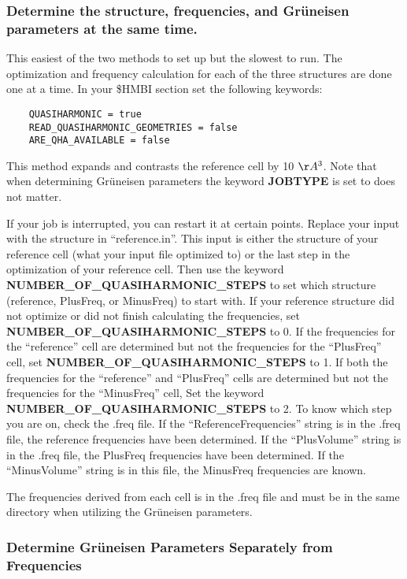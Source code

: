 \documentclass[11pt,letterpaper]{article}
\begin{document}
\begin{spacing}{1.0}
\subsubsection{ Determine the structure, frequencies, and Gr\"{u}neisen  parameters at the same time.}
\label{Sec-Grun-same-time}

This easiest of the two methods to set up but the slowest to run. The optimization and frequency calculation for each
of the three structures are done one at a time.
In your \$HMBI section set the following keywords:

\begin{verbatim}
    QUASIHARMONIC = true
    READ_QUASIHARMONIC_GEOMETRIES = false
    ARE_QHA_AVAILABLE = false
\end{verbatim}

This method expands and contrasts the reference cell by 10 $\AA^3$.
Note that when determining Gr\"{u}neisen parameters 
the  keyword {\bf JOBTYPE} is set to does not matter. 

If your job is interrupted, 
you can restart it at certain points. Replace your input with the structure in ``reference.in''. 
This input is either the structure of your reference cell (what your input file optimized to) or the last step in the optimization of 
your reference cell.
 Then use the keyword {\bf NUMBER\_OF\_QUASIHARMONIC\_STEPS} to set which structure (reference, 
PlusFreq, or MinusFreq) to start with.
If your reference structure did not optimize or did not finish 
calculating the frequencies, set 
{\bf NUMBER\_OF\_QUASIHARMONIC\_STEPS} to 0. If the
frequencies for the ``reference'' cell are determined but not the frequencies for the ``PlusFreq'' cell,
 set {\bf NUMBER\_OF\_QUASIHARMONIC\_STEPS} to 1. 
If both the frequencies for the  
``reference''  and ``PlusFreq'' cells are determined but not the frequencies for
the ``MinusFreq'' cell, 
Set the keyword {\bf NUMBER\_OF\_QUASIHARMONIC\_STEPS} to 2. To know which step 
you are on, check the .freq file. If the ``ReferenceFrequencies'' string
is in the .freq file, the reference frequencies have been determined. If the ``PlusVolume'' string is in the
.freq file, the PlusFreq frequencies have been determined. If the ``MinusVolume''
string is in this file, the MinusFreq frequencies are known.

The frequencies derived from each cell is in the .freq file and must be in the same directory when utilizing the 
Gr\"{u}neisen parameters.



\subsubsection{Determine Gr\"{u}neisen  Parameters Separately from Frequencies}
\label{Sec-Grun-freq-already}


\end{spacing}
\end{document}
